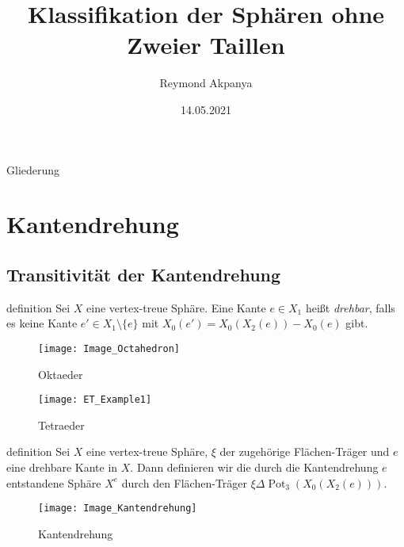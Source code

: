 \documentclass{beamer}
\author{Reymond Akpanya}
\title{Klassifikation der Sphären ohne Zweier Taillen}
\date{14.05.2021 }
\DeclareMathOperator{\Pot}{Pot}
\begin{document}
\frame{\maketitle}
\frame{\tableofcontents[currentsection]}
\begin{frame}{Gliederung}
\tableofcontents
\end{frame}
\section{Kantendrehung}
\subsection{Transitivität der Kantendrehung}
\begin{frame}{definition}
Sei $X$ eine vertex-treue Sphäre. Eine Kante $e\in X_1$ heißt  \emph{drehbar}, falls es keine Kante $e'\in X_1\setminus \{e\}$ mit $X_0(e')=X_0(X_2(e))-X_0(e)$ gibt.
\end{frame}
\begin{frame}
\begin{figure}[H]
\begin{center}
\texttt{[image: Image\_Octahedron]}
\end{center}
\caption{Oktaeder}
\end{figure}
\end{frame}
\begin{frame}
\begin{figure}[H]
\begin{center}
\texttt{[image: ET\_Example1]}
\end{center}
\caption{Tetraeder}
\end{figure}
\end{frame}
\begin{frame}{definition}
Sei $X$ eine vertex-treue Sphäre, $\xi$ der zugehörige Flächen-Träger und $e$ eine drehbare Kante in $X$. Dann definieren wir die durch die Kantendrehung $e$ entstandene Sphäre $X^e$ durch den Flächen-Träger $\xi \Delta \Pot_3(X_0(X_2(e))).$
\end{frame}
\begin{figure}[H]
\begin{center}
\texttt{[image: Image\_Kantendrehung]}
\end{center}
\caption{Kantendrehung}
\end{figure}
\end{document}
